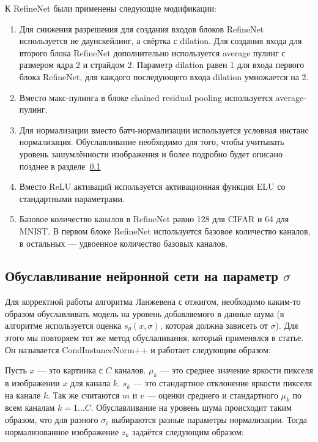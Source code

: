 \documentclass{article}
\begin{document}
К RefineNet были применены следующие модификации:
\begin{enumerate}
    \item Для снижения разрешения для создания входов блоков RefineNet
        используется не даунскейлинг, а свёртка с dilation. Для создания
        входа для второго блока RefineNet дополнительно используется average
        пулинг с размером ядра 2 и страйдом 2. Параметр dilation равен 1 для
        входа первого блока RefineNet, для каждого последующего входа dilation
        умножается на 2.
    \item Вместо макс-пулинга в блоке chained residual pooling используется
        average-пулинг.
    \item Для нормализации вместо батч-нормализации используется условная
        инстанс нормализация. Обуславливание необходимо для того, чтобы
        учитывать уровень зашумлённости изображения и более подробно будет
        описано позднее в разделе~\ref{section:condinstancenorm}
    \item Вместо ReLU активаций используется активационная функция ELU со
        стандартными параметрами.
    \item Базовое количество каналов в RefineNet равно 128 для CIFAR и 64 для
        MNIST. В первом блоке RefineNet используется базовое количество
        каналов, в остальных --- удвоенное количество базовых каналов.
\end{enumerate}

\subsection{Обуславливание нейронной сети на параметр $\sigma$}\label{section:condinstancenorm}

Для корректной работы алгоритма Ланжевена с отжигом, необходимо каким-то
образом обуславливать модель на уровень добавляемого в данные шума (в алгоритме
используется оценка $s_{\theta}(x, \sigma)$, которая должна зависеть от
$\sigma$). Для этого мы повторяем тот же метод обуслаливания, который
применялся в статье. Он называется CondInstanceNorm++ и работает следующим
образом:

Пусть $x$ --- это картинка с $C$ каналов. $\mu_k$ --- это среднее значение
яркости пикселя в изображении $x$ для канала $k$. $s_k$ --- это стандартное
отклонение яркости пикселя на канале $k$.  Так же считаются $m$ и $v$ ---
оценки среднего и стандартного $\mu_k$ по всем каналам $k=1\ldots C$.  
Обуславливание на уровень шума происходит таким образом, что для разного
$\sigma_i$ выбираются разные параметры нормализации. Тогда нормализованное
изображение $z_k$ задаётся следующим образом:
\end{document}
